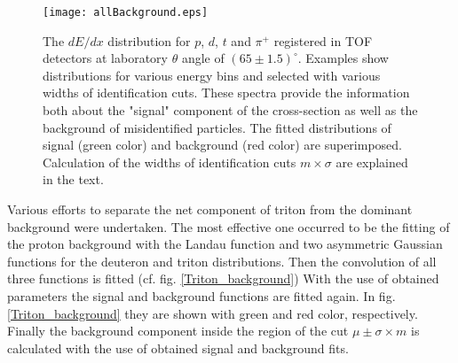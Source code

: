 \begin{figure}[!ht]
		\centering
		\texttt{[image: allBackground.eps]}
		\caption{The $dE/dx$ distribution for $p$, $d$, $t$ and $\pi^+$ registered in TOF detectors 
                at laboratory $\theta$ angle of $(65\pm 1.5)^{\circ}$. Examples show distributions for various energy bins 
                and selected with various widths of identification cuts. 
                These spectra provide the information both about the "signal" component of the cross-section 
                as well as the background of misidentified particles. The fitted distributions of signal (green color) and 
                background (red color) are superimposed. Calculation of the widths of identification cuts $m \times \sigma$ are explained in the text.}
		\label{backg}
\end{figure}  


Various efforts to separate the net component of triton from the dominant background were undertaken. 
The most effective one occurred to be the fitting of the proton background with the  Landau function and two asymmetric Gaussian functions for the deuteron and triton distributions. 
Then the convolution of all three functions is fitted (cf. fig. \ref{Triton_background})
With the use of obtained parameters the  
signal and background functions are fitted
again. In fig. \ref{Triton_background} 
they are shown with green and red color,  respectively. 
Finally the background component inside the region 
of the cut $\mu \pm \sigma \times m$
is calculated with the use of obtained  signal and background fits. 

